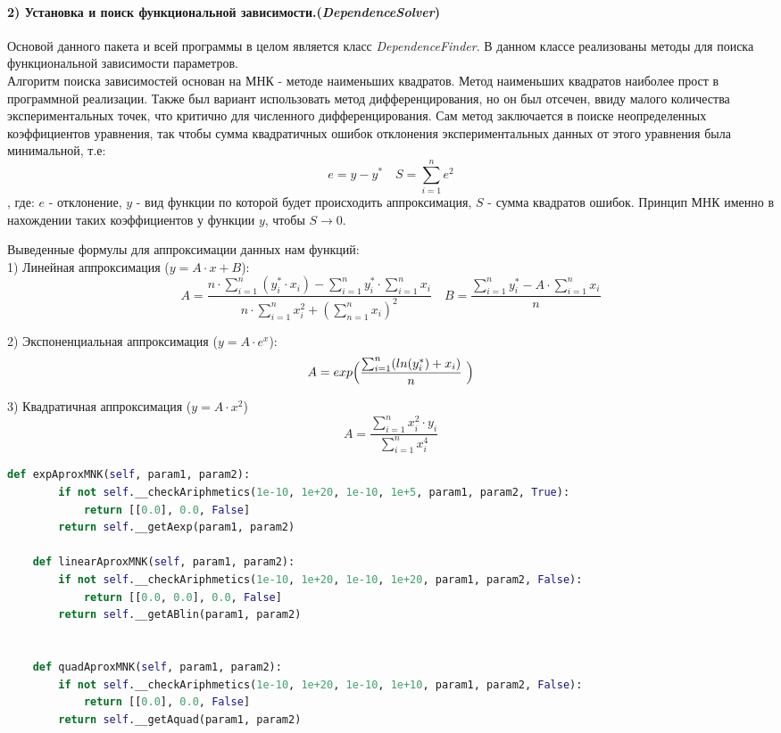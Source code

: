 	
	
	\paragraph{2) Установка и поиск функциональной зависимости.(\textit{DependenceSolver})
    \\
    }
	
	Основой данного пакета и всей программы в целом является класс \textit{DependenceFinder}. В данном классе реализованы методы для поиска функциональной зависимости параметров.\\
	Алгоритм поиска зависимостей основан на МНК - методе наименьших квадратов. Метод наименьших квадратов наиболее прост в программной реализации. Также был вариант использовать метод дифференцирования, но он был отсечен, ввиду малого количества экспериментальных точек, что критично для численного дифференцирования. Сам метод заключается в поиске неопределенных коэффициентов уравнения, так чтобы сумма квадратичных ошибок отклонения экспериментальных данных от этого уравнения была минимальной, т.е:\\
	$$e = y-y^* \quad S=\sum_{i=1}^{n} e^2 $$
	, где: $e$ - отклонение, $y$ - вид функции по которой будет происходить аппроксимация, $S$ - сумма квадратов ошибок. Принцип МНК именно в нахождении таких коэффициентов у функции $y$, чтобы $S \to 0$.
	
	Выведенные формулы для аппроксимации данных нам функций:\\

	1) Линейная аппроксимация ($y=A\cdot x + B$):
	$$A = \dfrac{ n\cdot \sum_{i=1}^n (y^*_i \cdot x_i) - \sum_{i=1}^n y^*_i \cdot \sum_{i=1}^n x_i} {n\cdot \sum_{i=1}^n x_i^2 + (\sum_{n=1}^n x_i)^2} \quad B = \frac{\sum_{i=1}^n y^*_i - A \cdot \sum_{i=1}^n x_i}{n}$$
	
	2) Экспоненциальная аппроксимация ($y = A \cdot e^x$):
    $$ A = exp \Bigr( \frac{\sum_{i=1}^n(ln (y^*_i) + x_i)}{n}\ \Bigl)$$

    3) Квадратичная аппроксимация ($y = A \cdot x^2$)
    $$ A = \frac{\sum^n_{i=1} x_i^2 \cdot y_i}{\sum^n_{i=1} x_i^4}$$

    \begin{lstlisting}[language=Python]
    def expAproxMNK(self, param1, param2):
        if not self.__checkAriphmetics(1e-10, 1e+20, 1e-10, 1e+5, param1, param2, True):
            return [[0.0], 0.0, False]
        return self.__getAexp(param1, param2)

    def linearAproxMNK(self, param1, param2):
        if not self.__checkAriphmetics(1e-10, 1e+20, 1e-10, 1e+20, param1, param2, False):
            return [[0.0, 0.0], 0.0, False]
        return self.__getABlin(param1, param2)


    def quadAproxMNK(self, param1, param2):
        if not self.__checkAriphmetics(1e-10, 1e+20, 1e-10, 1e+10, param1, param2, False):
            return [[0.0], 0.0, False]
        return self.__getAquad(param1, param2)
    \end{lstlisting}

